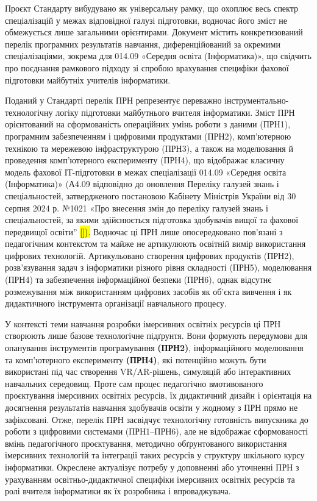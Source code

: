 Проєкт Стандарту вибудувано як універсальну рамку, що охоплює весь спектр спеціалізацій у межах відповідної галузі підготовки, водночас його зміст не обмежується лише загальними орієнтирами. Документ містить конкретизований перелік програмних результатів навчання, диференційований за окремими спеціалізаціями, зокрема для 014.09 «Середня освіта (Інформатика)», що свідчить про поєднання рамкового підходу зі спробою врахування специфіки фахової підготовки майбутніх учителів інформатики.

Поданий у Стандарті перелік ПРН репрезентує переважно інструментально-технологічну логіку підготовки майбутнього вчителя інформатики. Зміст ПРН орієнтований на сформованість операційних умінь роботи з даними (ПРН1), програмним забезпеченням і цифровими продуктами (ПРН2), комп'ютерною технікою та мережевою інфраструктурою (ПРН3), а також на моделювання й проведення комп'ютерного експерименту (ПРН4), що відображає класичну модель фахової ІТ-підготовки в межах спеціалізації 014.09 «Середня освіта (Інформатика)» (А4.09 відповідно до оновлення Переліку галузей знань і спеціальностей, затвердженого постановою Кабінету Міністрів України від 30 серпня 2024 р. №1021 «Про внесення змін до переліку галузей знань і спеціальностей, за якими здійснюється підготовка здобувачів вищої та фахової передвищої освіти'' \hl{{[}{]}).} Водночас ці ПРН лише опосередковано пов'язані з педагогічним контекстом та майже не артикулюють освітній вимір використання цифрових технологій. Артикульовано створення цифрових продуктів (ПРН2), розв'язування задач з інформатики різного рівня складності (ПРН5), моделювання (ПРН4) та забезпечення інформаційної безпеки (ПРН6), однак відсутнє розмежування між використанням цифрових засобів як об'єкта вивчення і як дидактичного інструмента організації навчального процесу.

У контексті теми навчання розробки імерсивних освітніх ресурсів ці ПРН створюють лише базове технологічне підґрунтя. Вони формують передумови для опанування інструментів програмування \textbf{(ПРН2)}, інформаційного моделювання та комп'ютерного експерименту \textbf{(ПРН4)}, які потенційно можуть бути використані під час створення VR/AR-рішень, симуляцій або інтерактивних навчальних середовищ. Проте сам процес педагогічно вмотивованого проєктування імерсивних освітніх ресурсів, їх дидактичний дизайн і орієнтація на досягнення результатів навчання здобувачів освіти у жодному з ПРН прямо не зафіксовані. Отже, перелік ПРН засвідчує технологічну готовність випускника до роботи з цифровими системами (ПРН1--ПРН6), але не відображає сформованості вмінь педагогічного проєктування, методично обґрунтованого використання імерсивних технологій та інтеграції таких ресурсів у структуру шкільного курсу інформатики. Окреслене актуалізує потребу у доповненні або уточненні ПРН з урахуванням освітньо-дидактичної специфіки імерсивних освітніх ресурсів та ролі вчителя інформатики як їх розробника і впроваджувача.


